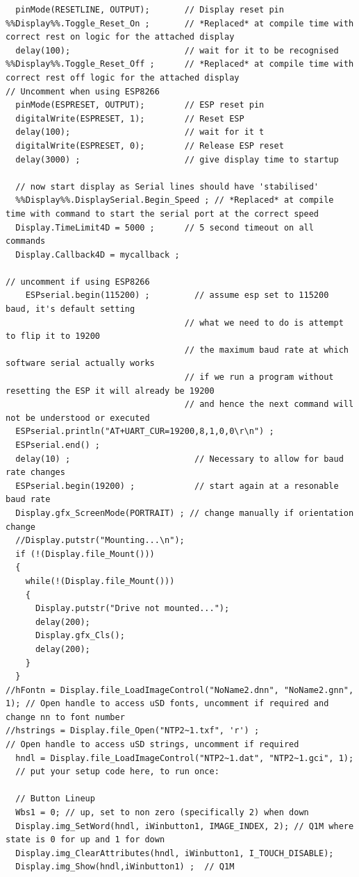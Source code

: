 \documentclass[12pt,a4paper]{report}
\begin{document}
\begin{lstlisting}
  pinMode(RESETLINE, OUTPUT);       // Display reset pin
%%Display%%.Toggle_Reset_On ;       // *Replaced* at compile time with correct rest on logic for the attached display
  delay(100);                       // wait for it to be recognised
%%Display%%.Toggle_Reset_Off ;      // *Replaced* at compile time with correct rest off logic for the attached display
// Uncomment when using ESP8266
  pinMode(ESPRESET, OUTPUT);        // ESP reset pin
  digitalWrite(ESPRESET, 1);        // Reset ESP
  delay(100);                       // wait for it t
  digitalWrite(ESPRESET, 0);        // Release ESP reset
  delay(3000) ;                     // give display time to startup

  // now start display as Serial lines should have 'stabilised'
  %%Display%%.DisplaySerial.Begin_Speed ; // *Replaced* at compile time with command to start the serial port at the correct speed
  Display.TimeLimit4D = 5000 ;      // 5 second timeout on all commands
  Display.Callback4D = mycallback ;

// uncomment if using ESP8266
    ESPserial.begin(115200) ;         // assume esp set to 115200 baud, it's default setting
                                    // what we need to do is attempt to flip it to 19200
                                    // the maximum baud rate at which software serial actually works
                                    // if we run a program without resetting the ESP it will already be 19200
                                    // and hence the next command will not be understood or executed
  ESPserial.println("AT+UART_CUR=19200,8,1,0,0\r\n") ;
  ESPserial.end() ;
  delay(10) ;                         // Necessary to allow for baud rate changes
  ESPserial.begin(19200) ;            // start again at a resonable baud rate
  Display.gfx_ScreenMode(PORTRAIT) ; // change manually if orientation change
  //Display.putstr("Mounting...\n");
  if (!(Display.file_Mount()))
  {
    while(!(Display.file_Mount()))
    {
      Display.putstr("Drive not mounted...");
      delay(200);
      Display.gfx_Cls();
      delay(200);
    }
  }
//hFontn = Display.file_LoadImageControl("NoName2.dnn", "NoName2.gnn", 1); // Open handle to access uSD fonts, uncomment if required and change nn to font number
//hstrings = Display.file_Open("NTP2~1.txf", 'r') ;                            // Open handle to access uSD strings, uncomment if required
  hndl = Display.file_LoadImageControl("NTP2~1.dat", "NTP2~1.gci", 1);
  // put your setup code here, to run once:

  // Button Lineup
  Wbs1 = 0; // up, set to non zero (specifically 2) when down
  Display.img_SetWord(hndl, iWinbutton1, IMAGE_INDEX, 2); // Q1M where state is 0 for up and 1 for down
  Display.img_ClearAttributes(hndl, iWinbutton1, I_TOUCH_DISABLE);
  Display.img_Show(hndl,iWinbutton1) ;  // Q1M


\end{lstlisting}
\end{document}
